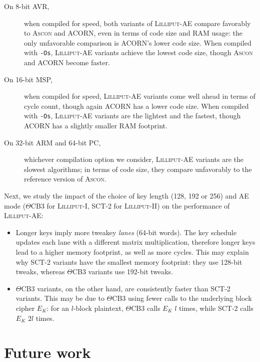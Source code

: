 \documentclass{article}
\begin{document}
\begin{description}
\item[On 8-bit AVR,] when compiled for speed, both variants of
  \textsc{Lilliput-AE} compare favorably to \textsc{Ascon} and ACORN,
  even in terms of code size and RAM usage: the only unfavorable
  comparison is ACORN's lower code size.  When compiled with
  \texttt{-Os}, \textsc{Lilliput-AE} variants achieve the lowest code
  size, though \textsc{Ascon} and ACORN become faster.

\item[On 16-bit MSP,] when compiled for speed, \textsc{Lilliput-AE}
  variants come well ahead in terms of cycle count, though again ACORN
  has a lower code size.  When compiled with \texttt{-Os},
  \textsc{Lilliput-AE} variants are the lightest and the fastest,
  though ACORN has a slightly smaller RAM footprint.

\item[On 32-bit ARM and 64-bit PC,] whichever compilation option we
  consider, \textsc{Lilliput-AE} variants are the slowest algorithms;
  in terms of code size, they compare unfavorably to the reference
  version of \textsc{Ascon}.
\end{description}

Next, we study the impact of the choice of key length (128, 192 or
256) and AE mode ($\Theta$CB3 for \textsc{Lilliput-I}, SCT-2 for
\textsc{Lilliput-II}) on the performance of \textsc{Lilliput-AE}:

\begin{itemize}
\item Longer keys imply more tweakey \emph{lanes} (64-bit words).  The
  key schedule updates each lane with a different matrix
  multiplication, therefore longer keys lead to a higher memory
  footprint, as well as more cycles.  This may explain why SCT-2
  variants have the smallest memory footprint: they use 128-bit
  tweaks, whereas $\Theta$CB3 variants use 192-bit tweaks.

\item $\Theta$CB3 variants, on the other hand, are consistently faster
  than SCT-2 variants.  This may be due to $\Theta$CB3 using fewer
  calls to the underlying block cipher $E_K$: for an $l$-block
  plaintext, $\Theta$CB3 calls $E_K$ $l$ times, while SCT-2 calls
  $E_K$ $2l$ times.
\end{itemize}

\section{Future work}
\label{sec:future}
\end{document}
